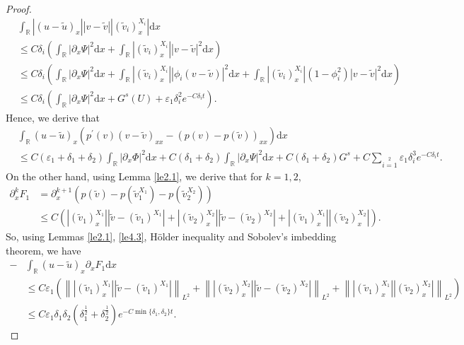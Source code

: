 \documentclass[10pt,a4paper]{amsart}
\newcommand{\dif}{\mathrm{d}}
\begin{document}
\begin{proof}
\begin{align*}
&\int_\mathbb{R}|(u-\widetilde{u})_{x}||v-\widetilde{v}||(\widetilde{v}_i)^{X_i}_{x}|\dif x\\
&\le C\delta_i\left(\int_\mathbb{R}|\partial_{x}\Psi|^2\dif x
+\int_\mathbb{R}|(\widetilde{v}_i)^{X_i}_{x}||v-\widetilde{v}|^2\dif x\right)\\
&\le  C\delta_i\left(\int_\mathbb{R}|\partial_{x}\Psi|^2\dif x
+\int_\mathbb{R}|(\widetilde{v}_i)^{X_i}_{x}||\phi_i(v-\widetilde{v})|^2\dif x
+\int_\mathbb{R}|(\widetilde{v}_i)^{X_i}_{x}|(1-\phi_i^2)|v-\widetilde{v}|^2\dif x\right)\\
&\le C\delta_i\left(\int_\mathbb{R}|\partial_{x}\Psi|^2\dif x
+G^s(U)
+\varepsilon_1 \delta_i^2e^{-C\delta_i t}\right).
\end{align*}
Hence, we derive that
\begin{align*}
 &\int_\mathbb{R}(u-\widetilde{u})_{x}(p^{\prime}(v)(v-\widetilde{v})_{xx}-(p(v)-p(\widetilde{v}))_{xx})\dif x\\
  &\le C(\varepsilon_1+\delta_1+\delta_2)\int_\mathbb{R}|\partial_{x}\Phi|^2\dif x
  +C(\delta_1+\delta_2)\int_\mathbb{R}|\partial_{x}\Psi|^2\dif x
  +C(\delta_1+\delta_2)G^s+C\sum\limits_{i=1}\limits^2\varepsilon_1 \delta_i^3e^{-C\delta_i t}.
\end{align*}
On the other hand, using Lemma \ref{le2.1}, we derive that for $k=1,2$,
\begin{align*}
\partial_x^{k}F_1&=
\partial_x^{k+1}\left(p(\widetilde{v})-p(\widetilde{v}_1^{X_1})-p(\widetilde{v}_2^{X_2})\right)\\
&\le
C\left(|(\widetilde{v}_1)^{X_1}_x||\widetilde{v}-(\widetilde{v}_1)^{X_1}|
+|(\widetilde{v}_2)^{X_2}_x||\widetilde{v}-(\widetilde{v}_2)^{X_2}|
+|(\widetilde{v}_1)^{X_1}_x||(\widetilde{v}_2)^{X_2}_x|\right).
\end{align*}
So, using Lemmas \ref{le2.1}, \ref{le4.3}, H\"{o}lder inequality and Sobolev's imbedding theorem, we have
\begin{align*}
-&\int_{\mathbb{R}}(u-\widetilde{u})_{x}\partial_{x}F_1\dif x\\
&\le C\varepsilon_1 \left(\left\||(\widetilde{v}_1)^{X_1}_x||\widetilde{v}-(\widetilde{v}_1)^{X_1}|\right\|_{L^2}
+\left\||(\widetilde{v}_2)^{X_2}_x||\widetilde{v}-(\widetilde{v}_2)^{X_2}|\right\|_{L^2}
+\left\||(\widetilde{v}_1)^{X_1}_x||(\widetilde{v}_2)^{X_2}_x|\right\|_{L^2}\right)\\
&\le C\varepsilon_1\delta_1\delta_2(\delta_1^{\frac{1}{2}}+\delta_2^{\frac{1}{2}})
e^{-C\min\{\delta_1,\delta_2\}t}.
\end{align*}

\end{proof}
\end{document}
